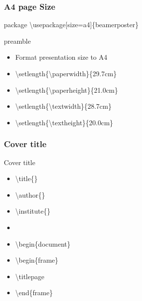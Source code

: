\documentclass[10pt,blue,xcolor=pdftex,dvipsnames,table,handout]{beamer}
\begin{document}


		\begin{frame}[t]
		\frametitle{A4 page Size}


			\begin{block} {package}
			\textbackslash usepackage[size=a4]\{beamerposter\}
			\end{block}


			\begin{block}{preamble}
			\begin{itemize}
			\item[]	Format presentation size to A4
			\item[]	\textbackslash setlength\{\textbackslash paperwidth\}\{29.7cm\}
			\item[]	\textbackslash setlength\{\textbackslash paperheight\}\{21.0cm\}
			\item[]	\textbackslash setlength\{\textbackslash textwidth\}\{28.7cm\}
			\item[]	\textbackslash setlength\{\textbackslash textheight\}\{20.0cm\}   
			\end{itemize}
			\end{block}


		\end{frame}



		\begin{frame}
		\frametitle{Cover title}

			\begin{block}{Cover title}
			\begin{itemize}
			\item[] \textbackslash title\{\} 
			\item[] \textbackslash author\{\} 
			\item[] \textbackslash institute\{\} 
			\item[] 
			\item[] \textbackslash begin\{document\}
			\item[] \textbackslash begin\{frame\}
			\item[] \textbackslash titlepage
			\item[] \textbackslash end\{frame\}
			\end{itemize}
			\end{block}


		\end{frame}
\end{document}
